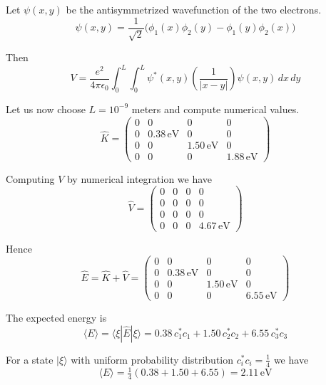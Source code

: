 \documentclass[12pt]{article}
\begin{document}
Let $\psi(x,y)$ be the antisymmetrized wavefunction of the two electrons.
\begin{equation*}
\psi(x,y)=\frac{1}{\sqrt{2}}\big(\phi_1(x)\phi_2(y)-\phi_1(y)\phi_2(x)\big)
\end{equation*}

Then
\begin{equation*}
V=\frac{e^2}{4\pi\epsilon_0}\int_0^L\int_0^L
\psi^*(x,y)\left(\frac{1}{|x-y|}\right)\psi(x,y)\,dx\,dy
\end{equation*}

Let us now choose $L=10^{-9}$ meters and compute numerical values.
\begin{equation*}
\hat{K}=\begin{pmatrix}
0 & 0 & 0 & 0\\
0 & 0.38\,\text{eV} & 0 & 0\\
0 & 0 & 1.50\,\text{eV} & 0\\
0 & 0 & 0 & 1.88\,\text{eV}
\end{pmatrix}
\end{equation*}

Computing $V$ by numerical integration we have
\begin{equation*}
\hat{V}=\begin{pmatrix}
0 & 0 & 0 & 0\\
0 & 0 & 0 & 0\\
0 & 0 & 0 & 0\\
0 & 0 & 0 & 4.67\,\text{eV}
\end{pmatrix}
\end{equation*}

Hence
\begin{equation*}
\hat{E}=\hat{K}+\hat{V}=\begin{pmatrix}
0 & 0 & 0 & 0\\
0 & 0.38\,\text{eV} & 0 & 0\\
0 & 0 & 1.50\,\text{eV} & 0\\
0 & 0 & 0 & 6.55\,\text{eV}
\end{pmatrix}
\end{equation*}

The expected energy is
\begin{equation*}
\langle E\rangle=\langle\xi|\hat E|\xi\rangle=0.38\,c_1^*c_1+1.50\,c_2^*c_2+6.55\,c_3^*c_3
\end{equation*}

For a state $|\xi\rangle$ with uniform probability distribution $c_i^*c_i=\tfrac{1}{4}$ we have
\begin{equation*}
\langle E\rangle=\tfrac{1}{4}(0.38+1.50+6.55)=2.11\,\text{eV}
\end{equation*}
\end{document}
